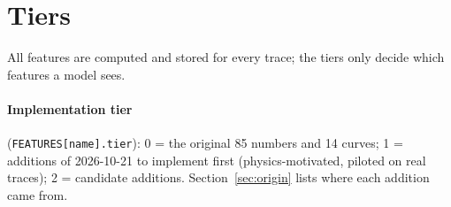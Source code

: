 \documentclass[10pt]{article}
\newcommand{\code}[1]{\texttt{#1}}
\renewcommand{\_}{\oldunderscore\allowbreak}
\begin{document}
\section{Tiers}
\label{sec:tiers}

All features are computed and stored for every trace; the tiers only decide which features a model sees.

\paragraph{Implementation tier} (\code{FEATURES[name].tier}): 0 = the original 85 numbers and 14 curves; 1 = additions of
2026-10-21 to implement first (physics-motivated, piloted on real traces); 2 = candidate additions. Section~\ref{sec:origin}
lists where each addition came from.
\end{document}

